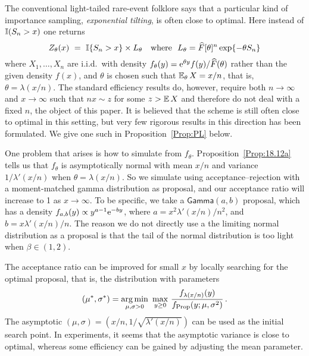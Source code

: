 %
The conventional light-tailed rare-event folklore says that a particular kind of importance sampling, \emph{exponential tilting}, is often close to optimal. Here
instead of
$\mathbb{I}(S_n>x)$ one returns
\[ Z_\theta(x)\  = \
\indi\{S_n > x\} \times L_\theta\quad \text{where\ \ }L_\theta=\widehat{F}[\theta]^n \exp\{ {-}\theta S_n\} \]
where $ X_1,\ldots,X_n $ are i.i.d.\ with density  $f_\theta(y) = \mathrm{e}^{\theta y} f(y) / \widehat{F}(\theta)$
 rather than the given density $f(x)$, and $\theta$ is chosen such that
$\operatorname{{\mathbb E}}_\theta X =x/n$, that is, $\theta=\lambda(x/n)$. The standard efficiency
results do, however, require both $n\to\infty$ and $x\to\infty$ such that $nx\sim z$
for some $z>\operatorname{{\mathbb E}} X$ and therefore
do not deal with a fixed $n$, the object of this paper. It is believed that the scheme
is still often close to optimal in this setting, but very few rigorous results in this direction
has been formulated. We give one such in Proposition~\ref{Prop:PL} below.

One problem that arises is how to simulate from $f_\theta$.
Proposition~\ref{Prop:18.12a} tells us that $f_\theta$ is asymptotically normal
with mean $x/n$ and variance $1/\lambda'(x/n)$ when $\theta=\lambda(x/n)$.
So we simulate using acceptance--rejection with a moment-matched
gamma distribution as proposal, and our acceptance ratio will increase to 1 as $x \to \infty$.
To be specific, we take a $\mathsf{Gamma}(a, b)$ proposal, which has a density
$f_{a,b}(y) \propto y^{a-1}\mathrm{e}^{-b y}$, where $a = x^2 \lambda'(x/n)/n^2$, and $b=x \lambda'(x/n)/n$.
The reason we do not directly use a the limiting normal distribution as a proposal is that the tail of the normal distribution is too light when $\beta \in (1,2)$.

\begin{remark}
The acceptance ratio can be improved for small $x$ by locally searching for the optimal proposal, that is, the distribution with parameters
\[ (\mu^*,\sigma^*) = \operatorname*{arg\,min}_{\mu,\sigma > 0} \,\, \max_{y \ge 0} \, \frac{ f_{\lambda(x/n)}(y) }{ f_{\mathrm{Prop}}(y ; \mu,\sigma^2) } \,. \]
The asymptotic $(\mu,\sigma)=(x/n, 1/\sqrt{\lambda'(x/n)})$ can be used as the initial search point. In experiments, it seems that the asymptotic variance is close to optimal, whereas some efficiency can be gained by adjusting the mean parameter.
\halmoss\end{remark}

